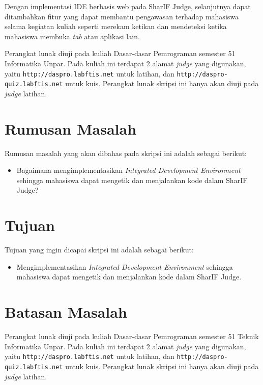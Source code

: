 Dengan implementasi IDE berbasis web pada SharIF Judge, selanjutnya dapat ditambahkan fitur yang dapat membantu pengawasan terhadap mahasiswa selama kegiatan kuliah seperti merekam ketikan dan mendeteksi ketika mahasiswa membuka \textit{tab} atau aplikasi lain.

Perangkat lunak diuji pada kuliah Dasar-dasar Pemrograman semester 51 Informatika Unpar. Pada kuliah ini terdapat 2 alamat \textit{judge} yang digunakan, yaitu \verb|http://daspro.labftis.net| untuk latihan, dan \verb|http://daspro-quiz.labftis.net| untuk kuis. Perangkat lunak skripsi ini hanya akan diuji pada \textit{judge} latihan.


\section{Rumusan Masalah}
\label{sec:rumusan}
Rumusan masalah yang akan dibahas pada skripsi ini adalah sebagai berikut:
\begin{itemize}
	\item Bagaimana mengimplementasikan {\it Integrated Development Environment} sehingga mahasiswa dapat mengetik dan menjalankan kode dalam SharIF Judge?
\end{itemize}


\section{Tujuan}
\label{sec:tujuan}
Tujuan yang ingin dicapai skripsi ini adalah sebagai berikut:
\begin{itemize}
	\item Mengimplementasikan {\it Integrated Development Environment} sehingga mahasiswa dapat mengetik dan menjalankan kode dalam SharIF Judge.
\end{itemize}

\section{Batasan Masalah}
\label{sec:batasan}
Perangkat lunak diuji pada kuliah Dasar-dasar Pemrograman semester 51 Teknik Informatika Unpar. Pada kuliah ini terdapat 2 alamat \textit{judge} yang digunakan, yaitu \verb|http://daspro.labftis.net| untuk latihan, dan \verb|http://daspro-quiz.labftis.net| untuk kuis. Perangkat lunak skripsi ini hanya akan diuji pada \textit{judge} latihan.


